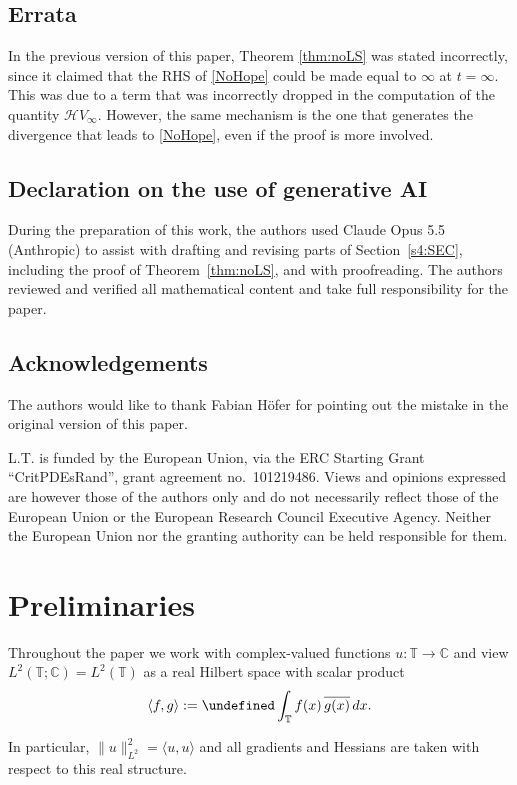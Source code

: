 \documentclass[letterpaper, 11pt,  reqno]{amsart}
\theoremstyle{definition}
\newcommand{\1}{\mathbbm 1}
\newcommand{\noi}{\noindent}
\newcommand{\C}{\mathbb{C}}
\newcommand{\T}{\mathbb{T}}
\renewcommand{\H}{\mathcal H}
\newcommand{\0}{\mathbf 0}
\renewcommand{\H}{\mathcal{H}}
\numberwithin{equation}{section}
\numberwithin{theorem}{section}
\let\Re=\undefined\DeclareMathOperator*{\Re}{Re}
\begin{document}
 \subsection*{Errata} In the previous version of this paper, Theorem \ref{thm:noLS} was stated incorrectly, since it claimed that the RHS of \eqref{NoHope} could be made equal to $\infty$ at $t = \infty$. This was due to a term that was incorrectly dropped in the computation of the quantity $\H V_\infty$. However, the same mechanism is the one that generates the divergence that leads to \eqref{NoHope}, even if the proof is more involved.
 
 \subsection*{Declaration on the use of generative AI}
During the preparation of this work, the authors used Claude Opus 5.5 (Anthropic) to assist with drafting and revising parts of Section~\ref{s4:SEC},
including the proof of Theorem~\ref{thm:noLS}, and with proofreading. The authors reviewed and verified all
mathematical content and take full responsibility for the paper.

\subsection*{Acknowledgements} 
 The authors would like to thank Fabian H\"ofer for pointing out the mistake in the original version of this paper. 

L.T. is funded by the European Union, via the ERC Starting Grant ``CritPDEsRand'', grant agreement no.\ 101219486.
Views and opinions expressed are however those of the authors only and do not necessarily reflect those of the European Union or the European Research Council Executive Agency.
Neither the European Union nor the granting authority can be held responsible for them.
 
\section{Preliminaries} 
\label{SEC:prelim}
 
 
Throughout the paper we work with complex-valued functions
$u:\T\to\C$ and view $L^2(\T;\C)=L^2(\T)$ as a real Hilbert space with scalar
product
\[
 \langle f,g\rangle := \Re\int_{\T} f(x)\,\overline{g(x)}\,dx.
\]
 
 
\noi
In particular, $\|u\|_{L^2}^2 = \langle u,u\rangle$ and all gradients
and Hessians are taken with respect to this real structure.
 
\end{document}
